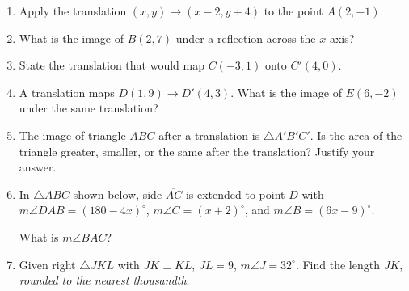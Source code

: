 \begin{enumerate}
\newpage
\item Apply the translation $(x,y) \rightarrow (x-2,y+4)$ to the point $A(2,-1)$. \vspace{2cm}
\item What is the image of $B(2,7)$ under a reflection across the $x$-axis? \vspace{2cm}
\item State the translation that would map $C(-3,1)$ onto $C'(4,0)$. \vspace{3cm}
\item A translation maps $D(1,9) \rightarrow D'(4,3)$. What is the image of $E(6,-2)$ under the same translation?  \vspace{3cm}

\item The image of triangle $ABC$ after a translation is $\triangle A'B'C'$. Is the area of the triangle greater, smaller, or the same after the translation? Justify your answer.

\newpage
\item In  $\triangle ABC$ shown below, side $\overline{AC}$ is extended to point $D$ with $m\angle DAB=(180-4x)^\circ$, $m\angle C=(x+2)^\circ$, and $m\angle B=(6x-9)^\circ$. \\[1cm]
  \begin{center}
  \end{center} \vspace{0.5cm}
  What is $m\angle BAC$?

\newpage
\item Given right $\triangle JKL$ with $\overline{JK} \perp \overline{KL}$, $JL=9$, $m\angle J=32^\circ$. Find the length $JK$, \emph{rounded to the nearest thousandth}.
  \begin{center}
  \end{center} \vspace{4cm}


\end{enumerate}
